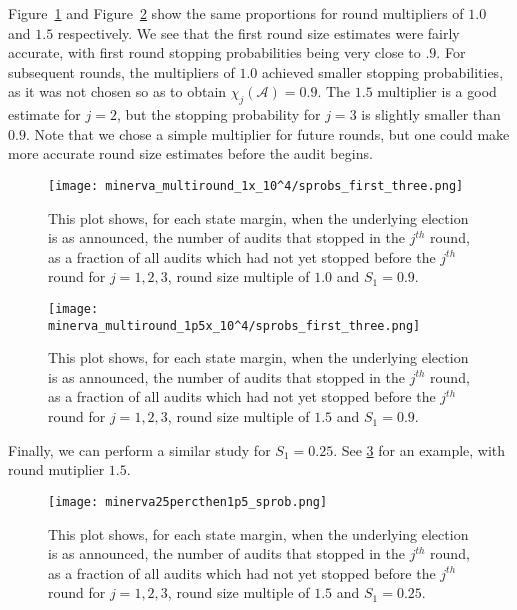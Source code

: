 Figure~\ref{fig:minerva1_sprob} and Figure~\ref{fig:minerva1p5_sprob} show the same proportions for \Minerva round multipliers of $1.0$ and $1.5$ respectively. We see that the first round size estimates were fairly accurate, with first round stopping probabilities being very close to $.9$. For subsequent rounds, the multipliers of $1.0$ achieved smaller stopping probabilities, as it was not chosen so as to obtain $\chi_j({\mathcal A}) = 0.9$. The $1.5$ multiplier is a good estimate for $j=2$, but the stopping probability for $j=3$ is slightly smaller than $0.9$. Note that we chose a simple multiplier for future rounds, but one could make more accurate round size estimates before the audit begins. 

\begin{figure}
\begin{centering}
\texttt{[image: minerva\_multiround\_1x\_10^4/sprobs\_first\_three.png]}
\caption{This plot shows, for each state margin, when the underlying election is as announced, the number of \Minerva audits that stopped in the $j^{th}$ round,
as a fraction of all \Minerva audits which had not yet stopped before the $j^{th}$ round for $j=1,2,3$, round size multiple of $1.0$ and $S_1=0.9$.}
\label{fig:minerva1_sprob}
\end{centering}
\end{figure}

\begin{figure}
\begin{centering}
\texttt{[image: minerva\_multiround\_1p5x\_10^4/sprobs\_first\_three.png]}
\caption{This plot shows, for each state margin, when the underlying election is as announced, the number of \Minerva audits that stopped in the $j^{th}$ round,
as a fraction of all \Minerva audits which had not yet stopped before the $j^{th}$ round for $j=1,2,3$, round size multiple of $1.5$ and $S_1=0.9$.}
\label{fig:minerva1p5_sprob}
\end{centering}
\end{figure}

Finally, we can perform a similar study for $S_1=0.25$. See \ref{fig:minerva_25} for an example, \Minerva with round mutiplier $1.5$. 

\begin{figure}
\begin{centering}
\texttt{[image: minerva25percthen1p5\_sprob.png]}
\caption{This plot shows, for each state margin, when the underlying election is as announced, the number of \Minerva audits that stopped in the $j^{th}$ round,
as a fraction of all \Minerva audits which had not yet stopped before the $j^{th}$ round for $j=1,2,3$, round size multiple of $1.5$ and $S_1 = 0.25$.}
\label{fig:minerva_25}
\end{centering}
\end{figure}
